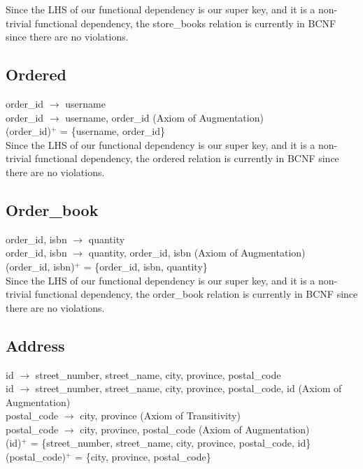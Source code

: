 \documentclass{article}
\begin{document}
    \noindent Since the LHS of our functional dependency is our super key, and it is a non-trivial functional dependency, the store\_books relation is currently in BCNF since there are no violations. \\
    
    \subsection{Ordered}
    order\_id $\rightarrow$ username \\
    order\_id $\rightarrow$ username, order\_id (Axiom of Augmentation) \\
    (order\_id)$^+$ = \{username, order\_id\} \\
    
    \noindent Since the LHS of our functional dependency is our super key, and it is a non-trivial functional dependency, the ordered relation is currently in BCNF since there are no violations. \\
    
    \subsection{Order\_book}
    order\_id, isbn $\rightarrow$ quantity \\ 
    order\_id, isbn $\rightarrow$ quantity, order\_id, isbn (Axiom of Augmentation) \\
    (order\_id, isbn)$^+$ = \{order\_id, isbn, quantity\} \\
    
    \noindent Since the LHS of our functional dependency is our super key, and it is a non-trivial functional dependency, the order\_book relation is currently in BCNF since there are no violations. \\
    
    \subsection{Address}
    id $\rightarrow$ street\_number, street\_name, city, province, postal\_code \\
    id $\rightarrow$ street\_number, street\_name, city, province, postal\_code, id (Axiom of Augmentation) \\
    postal\_code $\rightarrow$ city, province (Axiom of Transitivity) \\
    postal\_code $\rightarrow$ city, province, postal\_code (Axiom of Augmentation) \\
    (id)$^+$ = \{street\_number, street\_name, city, province, postal\_code, id\}
    (postal\_code)$^+$ = \{city, province, postal\_code\} \\
    
\end{document}
